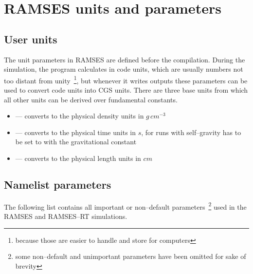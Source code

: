 
\chapter{RAMSES units and parameters} %

\label{AppendixC} %

\section{User units}
\label{app:Units}

The unit parameters in RAMSES are defined before the compilation.
During the simulation, the program calculates in code units, which are usually numbers not too distant from unity~\footnote{because those are easier to handle and store for computers}, but whenever it writes outputs these parameters can be used to convert code units into CGS units.
There are three base units from which all other units can be derived over fundamental constants.
\begin{itemize}
  \item {} \quad--- converts to the physical density units in $g\,cm^{-3}$
  \item {} \quad--- converts to the physical time units in $s$, for runs with self--gravity has to be set to  with the gravitational constant 
  \item {} \quad--- converts to the physical length units in $cm$
\end{itemize}

\section{Namelist parameters}
\label{app:Parameters}

The following list contains all important or non--default parameters~\footnote{some non--default and unimportant parameters have been omitted for sake of brevity} used in the RAMSES and RAMSES--RT simulations. \\[-3pt]

